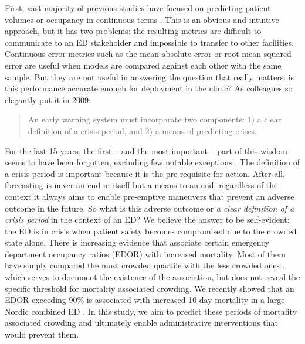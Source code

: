 First, vast majority of previous studies have focused on predicting patient volumes or occupancy in continuous terms \cite{Gul2018}. This is an obvious and intuitive approach, but it has two problems: the resulting metrics are difficult to communicate to an ED stakeholder and impossible to transfer to other facilities. Continuous error metrics such as the mean absolute error or root mean squared error are useful when models are compared against each other with the same sample. But they are not useful in answering the question that really matters: is this performance accurate enough for deployment in the clinic? As colleagues \citet{Hoot2009} so elegantly put it in 2009:

\begin{quote}
    An early warning system must incorporate two components: 1) a clear definition of a crisis period, and 2) a means of predicting crises.
\end{quote}

For the last 15 years, the first -- and the most important -- part of this wisdom seems to have been forgotten, excluding few notable exceptions \cite{Xie2022}. The definition of a crisis period is important because it is the pre-requisite for action. After all, forecasting is never an end in itself but a means to an end: regardless of the context it always aims to enable pre-emptive maneuvers that prevent an adverse outcome in the future. So what is this adverse outcome or \emph{a clear definition of a crisis period} in the context of an ED? We believe the answer to be self-evident: the ED is in crisis when patient safety becomes compromised due to the crowded state alone. There is increasing evidence that associate certain emergency department occupancy ratios (EDOR) with increased mortality. Most of them have simply compared the most crowded quartile with the less crowded ones \cite{Richardson2006, Jo2014}, which serves to document the existence of the association, but does not reveal the specific threshold for mortality associated crowding. We recently showed that an EDOR exceeding 90\% is associated with increased 10-day mortality in a large Nordic combined ED \cite{Eidsto2023}. In this study, we aim to predict these periods of mortality associated crowding and ultimately enable administrative interventions that would prevent them.

